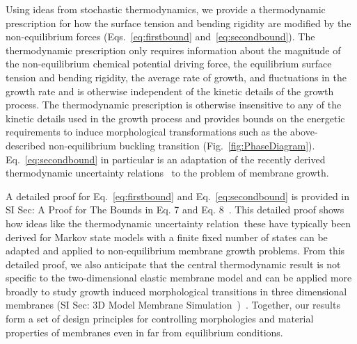 \documentclass[amsmath,preprintnumbers,10pt,nofootinbib,prl,twocolumn]{revtex4-1}
\begin{document}
Using ideas from stochastic thermodynamics, we provide a thermodynamic prescription for how the surface tension and bending rigidity are modified by the non-equilibrium forces (Eqs.~\ref{eq:firstbound} and~\ref{eq:secondbound}). The thermodynamic prescription only requires information about the magnitude of the non-equilibrium chemical potential driving force, the equilibrium surface tension and bending rigidity, the average rate of growth, and fluctuations in the growth rate and is otherwise independent of the kinetic details of the growth process. The thermodynamic prescription is otherwise insensitive to any of the kinetic details used in the growth process and provides bounds on the energetic requirements to induce morphological transformations such as the above-described non-equilibrium buckling transition (Fig.~\ref{fig:PhaseDiagram}). 
Eq.~\ref{eq:secondbound} in particular is an adaptation of the recently derived thermodynamic uncertainty relations~\cite{Gingrich2016} to the problem of membrane growth.

A detailed proof for Eq.~\ref{eq:firstbound} and Eq.~\ref{eq:secondbound} is provided in SI Sec: A Proof for The Bounds in Eq. 7 and Eq. 8~\cite{Supplementary}. This detailed proof shows how ideas like the thermodynamic uncertainty relation~\cite{Gingrich2016,Barato2015}\textendash these have typically been derived for Markov state models with a finite fixed number of states \textendash can be adapted and applied to non-equilibrium membrane growth problems. From this detailed proof, we also anticipate that the central thermodynamic result is not specific to the two-dimensional elastic membrane model and can be applied more broadly to study growth induced morphological transitions in three dimensional membranes (SI Sec: 3D Model Membrane Simulation~\cite{Supplementary})~\cite{Mahadevan2019}. 
Together, our results form a set of design principles for controlling morphologies and material properties of membranes even in far from equilibrium conditions.

\end{document}
